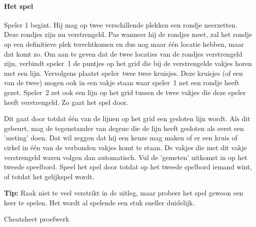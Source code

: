 \documentclass[../../main.tex]{subfiles}
\begin{document}
\paragraph*{Het spel}
Speler 1 begint. Hij mag op twee verschillende plekken een rondje neerzetten. Deze rondjes zijn nu verstrengeld. Pas wanneer hij de rondjes meet, zal het rondje op een definitieve plek terechtkomen en dus nog maar \'e\'en locatie hebben, maar dat komt zo. Om aan te geven dat de twee locaties van de rondjes verstrengeld zijn, verbindt speler~1 de puntjes op het grid die bij de verstrengelde vakjes horen met een lijn. Vervolgens plaatst speler~twee twee kruisjes. Deze kruisjes (of een van de twee) mogen ook in een vakje staan waar speler~1 net een rondje heeft gezet. Speler~2 zet ook een lijn op het grid tussen de twee vakjes die deze speler heeft verstrengeld. Zo gaat het spel door.

Dit gaat door totdat \'e\'en van de lijnen op het grid een gesloten lijn wordt. Als dit gebeurt, mag de tegenstander van degene die de lijn heeft gesloten als eerst een 'meting' doen. Dat wil zeggen dat hij een keuze mag maken of er een kruis of cirkel in \'e\'en van de verbonden vakjes komt te staan. De vakjes die met dit vakje verstrengeld waren volgen dan automatisch. Vul de 'gemeten' uitkomst in op het tweede speelbord. Speel het spel door totdat op het tweede spelbord iemand wint, of totdat het gelijkspel wordt.

\textbf{Tip:} Raak niet te veel verstrikt in de uitleg, maar probeer het spel gewoon een keer te spelen. Het wordt al spelende een stuk sneller duidelijk.

\fi%
\clearpage

Cheatsheet proefwerk
\end{document}
